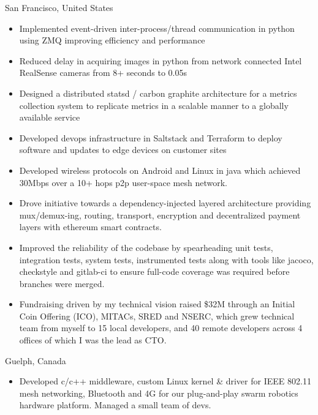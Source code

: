 \documentclass[10pt,a4paper,ragged2e,withhyper]{altacv}
\begin{document}
\begin{paracol}{2}
 {San Francisco, United States}
\begin{itemize}
\item Implemented event-driven inter-process/thread communication in python using ZMQ improving efficiency and performance
\item Reduced delay in acquiring images in python from network connected Intel RealSense cameras from 8+ seconds to 0.05s
\item Designed a distributed statsd / carbon graphite architecture for a metrics collection system to replicate metrics in a scalable manner to a globally available service
\item Developed devops infrastructure in Saltstack and Terraform to deploy software and updates to edge devices on customer sites
\end{itemize}

\begin{itemize}
\item Developed wireless protocols on Android and Linux in java which achieved 30Mbps over a 10+ hops p2p user-space mesh network.
\item Drove initiative towards a dependency-injected layered architecture providing mux/demux-ing, routing, transport, encryption and decentralized payment layers with ethereum smart contracts.
\item Improved the reliability of the codebase by spearheading unit tests, integration tests, system tests, instrumented tests along with tools like jacoco, checkstyle and gitlab-ci to ensure full-code coverage was required before branches were merged.
\item Fundraising driven by my technical vision raised \$32M through an Initial Coin Offering (ICO), MITACs, SRED and NSERC, which grew technical team from myself to 15 local developers, and 40 remote developers across 4 offices of which I was the lead as CTO.
\end{itemize}

 {Guelph, Canada}
\begin{itemize}
\item Developed c/c++ middleware, custom Linux kernel \& driver for IEEE 802.11 mesh networking, Bluetooth and 4G for our plug-and-play swarm robotics hardware platform. Managed a small team of devs.
\end{itemize}


\end{paracol}
\end{document}
